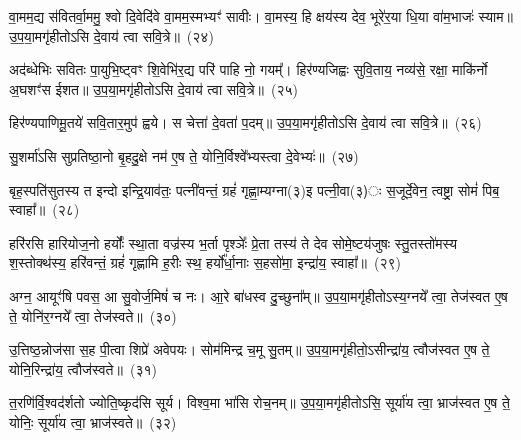 {\anuvakamend[{वः॒ स॒प्तविꣳ॑शतिश्च}]}%

वा॒मम॒द्य स॑वितर्वा॒ममु॒ श्वो दि॒वेदि॑वे वा॒मम॒स्मभ्यꣳ॑ सावीः। वा॒मस्य॒ हि क्षय॑स्य देव॒ भूरे॑र॒या धि॒या वा॑म॒भाजः॑ स्याम॥ उ॒प॒या॒मगृ॑हीतो\-ऽसि दे॒वाय॑ त्वा सवि॒त्रे॥~(२४)\ip

{\anuvakamend[{वा॒मं चतु॑र्विꣳशतिः}]}%

अद॑ब्धेभिः सवितः पा॒युभि॒ष्ट्वꣳ शि॒वेभि॑र॒द्य परि॑ पाहि नो॒ गयम्᳚। हिर॑ण्यजिह्वः सुवि॒ताय॒ नव्य॑से॒ रक्षा॒ माकि॑र्नो अ॒घशꣳ॑स ईशत॥ उ॒प॒या॒मगृ॑हीतो\-ऽसि दे॒वाय॑ त्वा सवि॒त्रे॥~(२५)\ip

{\anuvakamend[{अद॑ब्धेभि॒स्त्रयो॑विꣳशतिः}]}%

हिर॑ण्यपाणिमू॒तये॑ सवि॒तार॒मुप॑ ह्वये। स चेत्ता॑ दे॒वता॑ प॒दम्॥ उ॒प॒या॒मगृ॑हीतो\-ऽसि दे॒वाय॑ त्वा सवि॒त्रे॥~(२६)\ip

{\anuvakamend[{हिर॑ण्यपाणिं॒ चतु॑र्दश}]}%

सु॒शर्मा॑\-ऽसि सुप्रतिष्ठा॒नो बृ॒हदु॒क्षे नम॑ ए॒ष ते॒ योनि॒र्विश्वे᳚भ्यस्त्वा दे॒वेभ्यः॑॥~(२७)\ip

{\anuvakamend[{सु॒शर्मा॒ द्वाद॑श}]}%

बृह॒स्पति॑सुतस्य त इन्दो इन्द्रि॒याव॑तः॒ पत्नी॑वन्तं॒ ग्रहं॑ गृह्णा॒म्यग्ना(३)इ पत्नी॒वा(३)ः स॒जूर्दे॒वेन॒ त्वष्ट्रा॒ सोमं॑ पिब॒ स्वाहा᳚॥~(२८)\ip

{\anuvakamend[{बृह॒स्पति॑सुतस्य॒ पञ्च॑दश}]}%

हरि॑रसि हारियोज॒नो हर्योः᳚ स्था॒ता वज्र॑स्य भ॒र्ता पृश्ञेः᳚ प्रे॒ता तस्य॑ ते देव सोमे॒ष्टय॑जुषः स्तु॒तस्तो॑मस्य श॒स्तोक्थ॑स्य॒ हरि॑वन्तं॒ ग्रहं॑ गृह्णामि ह॒रीः स्थ॒ हर्यो᳚र्धा॒नाः स॒हसो॑मा॒ इन्द्रा॑य॒ स्वाहा᳚॥~(२९)\ip

{\anuvakamend[{हरिः॒ षड्विꣳ॑शतिः}]}%

अग्न॒ आयूꣳ॑षि पवस॒ आ सु॒वोर्ज॒मिषं॑ च नः। आ॒रे बा॑धस्व दु॒च्छुना᳚म्॥ उ॒प॒या॒मगृ॑हीतो\-ऽस्य॒ग्नये᳚ त्वा॒ तेज॑स्वत ए॒ष ते॒ योनि॑र॒ग्नये᳚ त्वा॒ तेज॑स्वते॥~(३०)\ip

{\anuvakamend[{अग्न॒ आयूꣳ॑षि॒ त्रयो॑वि ꣳशतिः}]}%

उ॒त्तिष्ठ॒न्नोज॑सा स॒ह पी॒त्वा शिप्रे॑ अवेपयः। सोम॑मिन्द्र च॒मू सु॒तम्॥ उ॒प॒या॒मगृ॑हीतो॒\-ऽसीन्द्रा॑य॒ त्वौज॑स्वत ए॒ष ते॒ योनि॒रिन्द्रा॑य॒ त्वौज॑स्वते॥~(३१)\ip

{\anuvakamend[{उ॒त्तिष्ठ॒न्नेक॑विꣳशतिः}]}%

त॒रणि॑र्वि॒श्वद॑र्\mbox{}शतो ज्योति॒ष्कृद॑सि सूर्य। विश्व॒मा भा॑सि रोच॒नम्॥ उ॒प॒या॒मगृ॑हीतो\-ऽसि॒ सूर्या॑य त्वा॒ भ्राज॑स्वत ए॒ष ते॒ योनिः॒ सूर्या॑य त्वा॒ भ्राज॑स्वते॥~(३२)\ip

